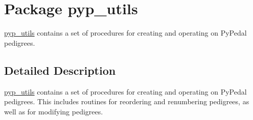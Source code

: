 \hypertarget{namespacepyp__utils}{
\section{Package pyp\_\-utils}
\label{namespacepyp__utils}
}


\hyperlink{namespacepyp__utils}{pyp\_\-utils} contains a set of procedures for creating and operating on PyPedal pedigrees.  




\subsection{Detailed Description}
\hyperlink{namespacepyp__utils}{pyp\_\-utils} contains a set of procedures for creating and operating on PyPedal pedigrees. This includes routines for reordering and renumbering pedigrees, as well as for modifying pedigrees. 
